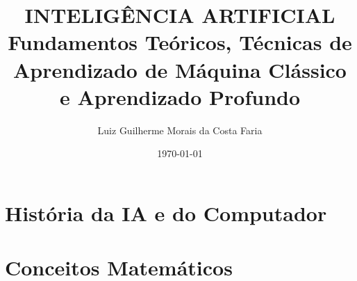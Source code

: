 \documentclass[
    12pt,            %
    a4paper,         %
    book,            %
    openright,       %
    twoside,         %
    brazil,          %
    citacao=authoryear
]{abntex2}
\title{INTELIGÊNCIA ARTIFICIAL \\ 
    \large Fundamentos Teóricos, Técnicas de Aprendizado de Máquina Clássico e Aprendizado Profundo}
\author{Luiz Guilherme Morais da Costa Faria}
\date{\today} %
\begin{document}
\frontmatter

\imprimircapa
\imprimirfolhaderosto


\tableofcontents

\mainmatter

\part{História da IA e do Computador}




\part{Conceitos Matemáticos}
\end{document}
